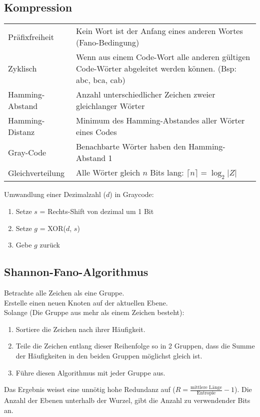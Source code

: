 \subsection{Kompression}
\settowidth{\MyLenA}{Hamming-Abstand~~}
\begin{tabular}{@{}p{\the\MyLenA}%
				@{}p{\linewidth-\the\MyLenA}}
	Präfixfreiheit & Kein Wort ist der Anfang eines anderen Wortes (Fano-Bedingung)\\
	Zyklisch & Wenn aus einem Code-Wort alle anderen gültigen Code-Wörter abgeleitet werden können. (Bsp: abc, bca, cab)\\
	Hamming-Abstand & Anzahl unterschiedlicher Zeichen zweier gleichlanger Wörter\\
	Hamming-Distanz & Minimum des Hamming-Abstandes aller Wörter eines Codes\\
	Gray-Code		& Benachbarte Wörter haben den Hamming-Abstand 1\\
	Gleichverteilung & Alle Wörter gleich $n$ Bits lang: $\lceil n\rceil = \log_2 |Z|$\\
\end{tabular}

Umwandlung einer Dezimalzahl ($d$) in Graycode:
\begin{enumerate}
	\item Setze $s$ = Rechts-Shift von dezimal um 1 Bit
	\item Setze $g$ = XOR($d$, $s$)
	\item Gebe $g$ zurück
\end{enumerate}

\subsection{Shannon-Fano-Algorithmus}
Betrachte alle Zeichen als eine Gruppe.\\
Erstelle einen neuen Knoten auf der aktuellen Ebene.\\
Solange (Die Gruppe aus mehr als einem Zeichen besteht):
\begin{enumerate}
	\item Sortiere die Zeichen nach ihrer Häufigkeit.
	\item Teile die Zeichen entlang dieser Reihenfolge so in 2 Gruppen, dass die Summe der Häufigkeiten in den beiden Gruppen möglichst gleich ist.
	\item Führe diesen Algorithmus mit jeder Gruppe aus.
\end{enumerate}
Das Ergebnis weisst eine unnötig hohe Redundanz auf ($R = \frac{\mbox{mittlere Länge}}{\mbox{Entropie}} - 1$).
Die Anzahl der Ebenen unterhalb der Wurzel, gibt die Anzahl zu verwendender Bits an.

